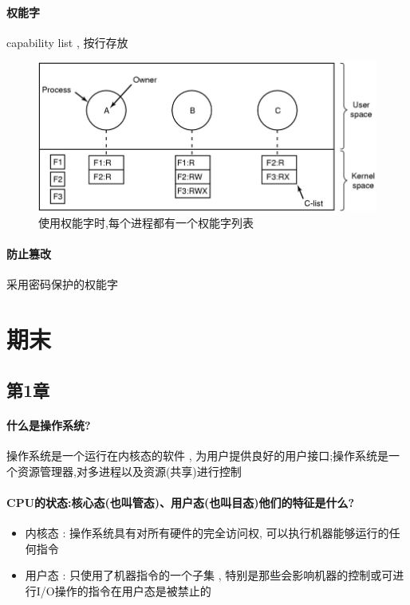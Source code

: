 \documentclass[UTF8,a4paper]{ctexart}
\begin{document}
\paragraph{权能字} capability list , 按行存放 
\begin{figure}[H]
	\centering
	\includegraphics[scale = 0.5]{assets/ModernOperatingSystems/2018-01-10-20-35-44.png}
	\caption{使用权能字时,每个进程都有一个权能字列表}
\end{figure}

\paragraph{防止篡改} 采用密码保护的权能字

\section{期末}
\subsection{第1章}
\paragraph{什么是操作系统?}操作系统是一个运行在内核态的软件 , 为用户提供良好的用户接口;操作系统是一个资源管理器,对多进程以及资源(共享)进行控制

\paragraph{CPU的状态:核心态(也叫管态)、用户态(也叫目态)他们的特征是什么?}
\begin{itemize}
	\item 内核态 : 操作系统具有对所有硬件的完全访问权, 可以执行机器能够运行的任何指令
	\item 用户态 : 只使用了机器指令的一个子集 , 特别是那些会影响机器的控制或可进行I/O操作的指令在用户态是被禁止的
\end{itemize}
\end{document}
